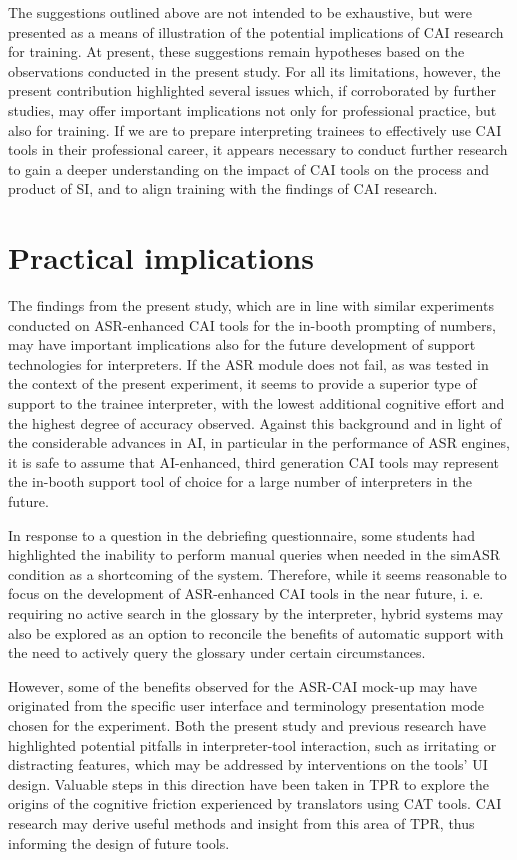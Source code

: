 The suggestions outlined above are not intended to be exhaustive, but were presented as a means of illustration of the potential implications of CAI research for training. At present, these suggestions remain hypotheses based on the observations conducted in the present study. For all its limitations, however, the present contribution highlighted several issues which, if corroborated by further studies, may offer important implications not only for professional practice, but also for training. If we are to prepare interpreting trainees to effectively use CAI tools in their professional career, it appears necessary to conduct further research to gain a deeper understanding on the impact of CAI tools on the process and product of SI, and to align training with the findings of CAI research.


\section{Practical implications} \label{implications_practical}
The findings from the present study, which are in line with similar experiments conducted on ASR-enhanced CAI tools for the in-booth prompting of numbers, may have important implications also for the future development of support technologies for interpreters. If the ASR module does not fail, as was tested in the context of the present experiment, it seems to provide a superior type of support to the trainee interpreter, with the lowest additional cognitive effort and the highest degree of accuracy observed. Against this background and in light of the considerable advances in AI, in particular in the performance of ASR engines, it is safe to assume that AI-enhanced, third generation CAI tools may represent the in-booth support tool of choice for a large number of interpreters in the future.

In response to a question in the debriefing questionnaire, some students had highlighted the inability to perform manual queries when needed in the simASR condition as a shortcoming of the system. Therefore, while it seems reasonable to focus on the development of ASR-enhanced CAI tools in the near future, i. e. requiring no active search in the glossary by the interpreter, hybrid systems may also be explored as an option to reconcile the benefits of automatic support with the need to actively query the glossary under certain circumstances.

However, some of the benefits observed for the ASR-CAI mock-up may have originated from the specific user interface and terminology presentation mode chosen for the experiment. Both the present study and previous research have highlighted potential pitfalls in interpreter-tool interaction, such as irritating or distracting features, which may be addressed by interventions on the tools' UI design. Valuable steps in this direction have been taken in TPR to explore the origins of the cognitive friction experienced by translators using CAT tools. CAI research may derive useful methods and insight from this area of TPR, thus informing the design of future tools.


